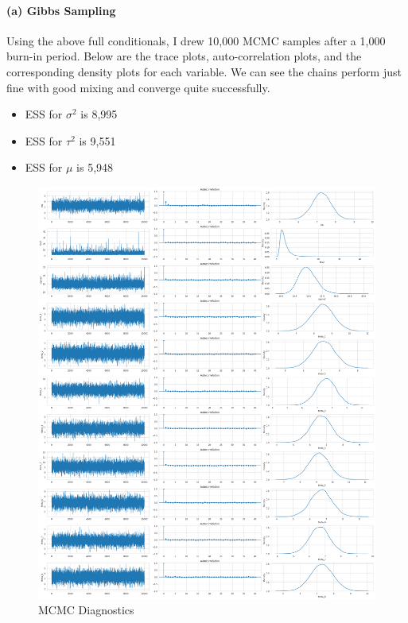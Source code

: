 \documentclass[11pt, letterpaper]{article}
\begin{document}
\paragraph{(a) Gibbs Sampling}
Using the above full conditionals, I drew 10,000 MCMC samples after a 1,000 burn-in period. Below are the trace plots, auto-correlation plots, and the corresponding density plots for each variable. We can see the chains perform just fine with good mixing and converge quite successfully.
\begin{itemize}
    \item ESS for $\sigma^2$ is 8,995
    \item ESS for $\tau^2$ is 9,551
    \item ESS for $\mu$ is 5,948
\end{itemize}
\begin{figure}[!h]
  \centering
  \includegraphics[width=1.0\textwidth]{3.a.png}
  \captionsetup{justification=centering}
  \caption{MCMC Diagnostics}
\end{figure}

\newpage
\end{document}
